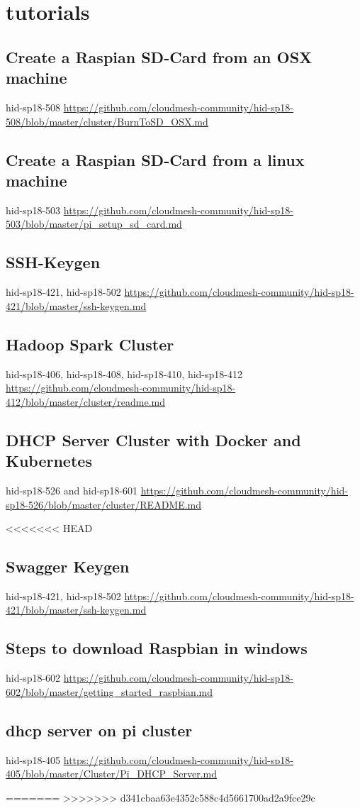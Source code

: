 \chapter{tutorials}

\section{Create a Raspian SD-Card from an OSX machine}
hid-sp18-508
\url{https://github.com/cloudmesh-community/hid-sp18-508/blob/master/cluster/BurnToSD_OSX.md}


\section{Create a Raspian SD-Card from a linux machine}
hid-sp18-503 
\url{https://github.com/cloudmesh-community/hid-sp18-503/blob/master/pi_setup_sd_card.md}

\section{SSH-Keygen}
hid-sp18-421, hid-sp18-502
\url{https://github.com/cloudmesh-community/hid-sp18-421/blob/master/ssh-keygen.md}


\section{Hadoop Spark Cluster }
hid-sp18-406,  hid-sp18-408, hid-sp18-410, hid-sp18-412
\url{https://github.com/cloudmesh-community/hid-sp18-412/blob/master/cluster/readme.md}

 

\section{DHCP Server Cluster with Docker and Kubernetes }
hid-sp18-526 and hid-sp18-601
\url{https://github.com/cloudmesh-community/hid-sp18-526/blob/master/cluster/README.md}


<<<<<<< HEAD
\section{Swagger Keygen}
hid-sp18-421, hid-sp18-502
\url{https://github.com/cloudmesh-community/hid-sp18-421/blob/master/ssh-keygen.md}

\section{Steps to download Raspbian in windows}
hid-sp18-602
\url{https://github.com/cloudmesh-community/hid-sp18-602/blob/master/getting_started_raspbian.md}

\section{dhcp server on pi cluster}
hid-sp18-405 
\url{https://github.com/cloudmesh-community/hid-sp18-405/blob/master/Cluster/Pi_DHCP_Server.md}

=======
>>>>>>> d341cbaa63e4352c588c4d5661700ad2a9fce29c
